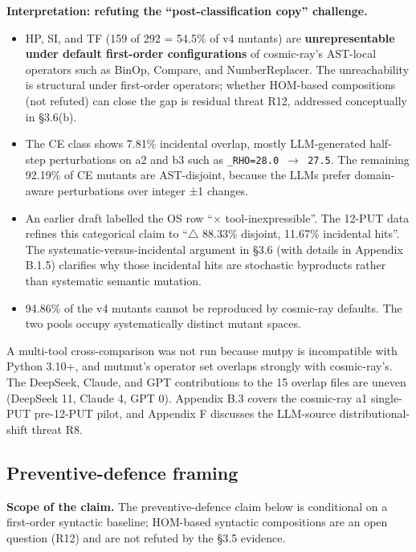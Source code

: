 \documentclass[acmsmall,screen,review]{acmart}
\providecommand{\tightlist}{\setlength{\itemsep}{0pt}\setlength{\parskip}{0pt}}
\begin{document}
\textbf{Interpretation: refuting the ``post-classification copy''
challenge.}

\begin{itemize}
\tightlist
\item
  HP, SI, and TF (159 of 292 = 54.5\% of v4 mutants) are
  \textbf{unrepresentable under default first-order configurations} of
  cosmic-ray's AST-local operators such as BinOp, Compare, and
  NumberReplacer. The unreachability is structural under first-order
  operators; whether HOM-based compositions \citep{jia2008subtle} (not
  refuted) can close the gap is residual threat R12, addressed
  conceptually in §3.6(b).
\item
  The CE class shows 7.81\% incidental overlap, mostly LLM-generated
  half-step perturbations on a2 and b3 such as
  \texttt{\_RHO=28.0\ $\to$\ 27.5}. The remaining 92.19\% of CE mutants are
  AST-disjoint, because the LLMs prefer domain-aware perturbations over
  integer ±1 changes.
\item
  An earlier draft labelled the OS row ``$\times$ tool-inexpressible''. The
  12-PUT data refines this categorical claim to ``$\bigtriangleup$ 88.33\% disjoint,
  11.67\% incidental hits''. The systematic-versus-incidental argument
  in §3.6 (with details in Appendix B.1.5) clarifies why those
  incidental hits are stochastic byproducts rather than systematic
  semantic mutation.
\item
  94.86\% of the v4 mutants cannot be reproduced by cosmic-ray defaults.
  The two pools occupy systematically distinct mutant spaces.
\end{itemize}

A multi-tool cross-comparison was not run because mutpy is incompatible
with Python 3.10+, and mutmut's operator set overlaps strongly with
cosmic-ray's. The DeepSeek, Claude, and GPT contributions to the 15
overlap files are uneven (DeepSeek 11, Claude 4, GPT 0). Appendix B.3
covers the cosmic-ray a1 single-PUT pre-12-PUT pilot, and Appendix F
discusses the LLM-source distributional-shift threat R8.

\subsection{Preventive-defence framing}\label{preventive-defence-framing}

\textbf{Scope of the claim.} The preventive-defence claim below is
conditional on a first-order syntactic baseline; HOM-based syntactic
compositions are an open question (R12) and are not refuted by the §3.5
evidence.
\end{document}
